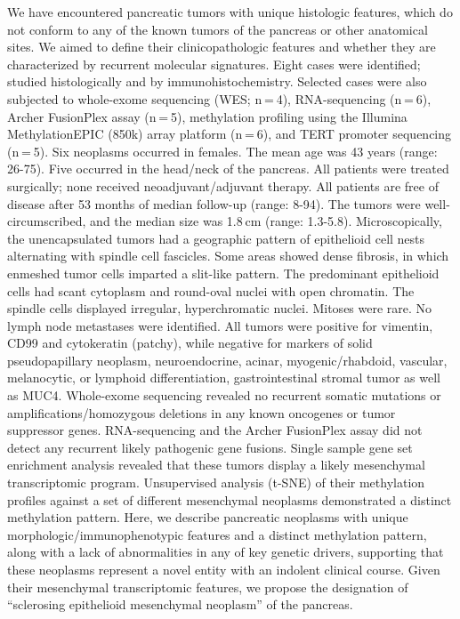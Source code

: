 \documentclass[
]{article}
\begin{document}
We have encountered pancreatic tumors with unique histologic features,
which do not conform to any of the known tumors of the pancreas or other
anatomical sites. We aimed to define their clinicopathologic features
and whether they are characterized by recurrent molecular signatures.
Eight cases were identified; studied histologically and by
immunohistochemistry. Selected cases were also subjected to whole-exome
sequencing (WES; n = 4), RNA-sequencing (n = 6), Archer FusionPlex assay
(n = 5), methylation profiling using the Illumina MethylationEPIC (850k)
array platform (n = 6), and TERT promoter sequencing (n = 5). Six
neoplasms occurred in females. The mean age was 43 years (range: 26-75).
Five occurred in the head/neck of the pancreas. All patients were
treated surgically; none received neoadjuvant/adjuvant therapy. All
patients are free of disease after 53 months of median follow-up (range:
8-94). The tumors were well-circumscribed, and the median size was
1.8 cm (range: 1.3-5.8). Microscopically, the unencapsulated tumors had
a geographic pattern of epithelioid cell nests alternating with spindle
cell fascicles. Some areas showed dense fibrosis, in which enmeshed
tumor cells imparted a slit-like pattern. The predominant epithelioid
cells had scant cytoplasm and round-oval nuclei with open chromatin. The
spindle cells displayed irregular, hyperchromatic nuclei. Mitoses were
rare. No lymph node metastases were identified. All tumors were positive
for vimentin, CD99 and cytokeratin (patchy), while negative for markers
of solid pseudopapillary neoplasm, neuroendocrine, acinar,
myogenic/rhabdoid, vascular, melanocytic, or lymphoid differentiation,
gastrointestinal stromal tumor as well as MUC4. Whole-exome sequencing
revealed no recurrent somatic mutations or amplifications/homozygous
deletions in any known oncogenes or tumor suppressor genes.
RNA-sequencing and the Archer FusionPlex assay did not detect any
recurrent likely pathogenic gene fusions. Single sample gene set
enrichment analysis revealed that these tumors display a likely
mesenchymal transcriptomic program. Unsupervised analysis (t-SNE) of
their methylation profiles against a set of different mesenchymal
neoplasms demonstrated a distinct methylation pattern. Here, we describe
pancreatic neoplasms with unique morphologic/immunophenotypic features
and a distinct methylation pattern, along with a lack of abnormalities
in any of key genetic drivers, supporting that these neoplasms represent
a novel entity with an indolent clinical course. Given their mesenchymal
transcriptomic features, we propose the designation of ``sclerosing
epithelioid mesenchymal neoplasm'' of the pancreas.
\end{document}
